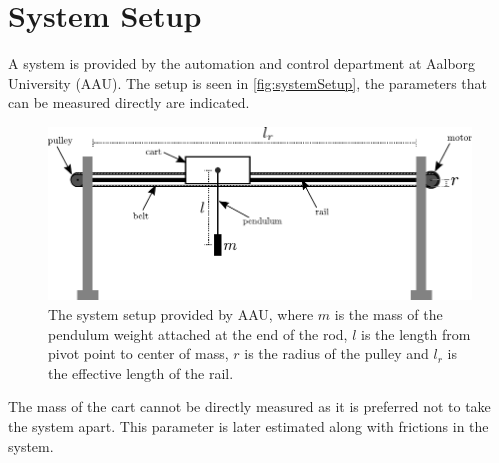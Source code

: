 \section{System Setup}
A system is provided by the automation and control department at Aalborg University (AAU). The setup is seen in \autoref{fig:systemSetup}, the parameters that can be measured directly are indicated.

\begin{figure}[H]
  \includegraphics[width=.8\textwidth]{figures/systemSetup}
  \caption{The system setup provided by AAU, where $m$ is the mass of the pendulum weight attached at the end of the rod, $l$ is the length from pivot point to center of mass, $r$ is the radius of the pulley and $l_r$ is the effective length of the rail.}
  \label{fig:systemSetup}
\end{figure}

The mass of the cart cannot be directly measured as it is preferred not to take the system apart. This parameter is later estimated along with frictions in the system. 

